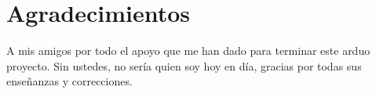 \chapter*{Agradecimientos}

A mis amigos por todo el apoyo que me han dado para terminar este arduo proyecto. Sin ustedes, no sería quien soy hoy en día, gracias por todas sus enseñanzas y correcciones.


 \newpage
 \tableofcontents
 
\cleardoublepage
{} %
\listoffigures

